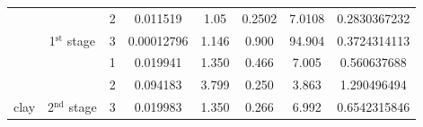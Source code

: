 \documentclass[review,times,3p,twocolumn,10pt]{elsarticle}
\begin{document}
\begin{table}[]
\begin{tabular}{|c|c|c|c|c|c|c|c}
                       & {\color[HTML]{000000} }                                          & 2                                                & \num{0.011519}                                                & 1.05                                                         & 0.2502                                                       & 7.0108                                                       & \multicolumn{1}{c|}{\num{0.2830367232}}                                                                                          \\ \cline{3-8} 
                       & \multirow{-3}{*}{{\color[HTML]{000000} 1$^{\textrm{st}}$ stage}} & 3                                                & \num{0.00012796}                                              & 1.146                                                        & 0.900                                                        & 94.904                                                       & \multicolumn{1}{c|}{\num{0.3724314113}}                                                                                          \\ \cline{2-8} 
                       &                                                                  & \cellcolor[HTML]{C0C0C0}1                        & \cellcolor[HTML]{C0C0C0}\num{0.019941}                        & \cellcolor[HTML]{C0C0C0}1.350                                & \cellcolor[HTML]{C0C0C0}0.466                                & \cellcolor[HTML]{C0C0C0}7.005                                & \multicolumn{1}{c|}{\cellcolor[HTML]{C0C0C0}\num{0.560637688}}                                                                   \\ \cline{3-8} 
                       &                                                                  & 2                                                & \num{0.094183}                                                & 3.799                                                        & 0.250                                                        & 3.863                                                        & \multicolumn{1}{c|}{\num{1.290496494}}                                                                                           \\ \cline{3-8} 
\multirow{-7}{*}{clay} & \multirow{-3}{*}{2$^{\textrm{nd}}$ stage}                        & 3                                                & \num{0.019983}                                                & 1.350                                                        & 0.266                                                        & 6.992                                                        & \multicolumn{1}{c|}{\num{0.6542315846}}                                                                                          \\ \hline

\end{tabular}
\end{table}
\end{document}
